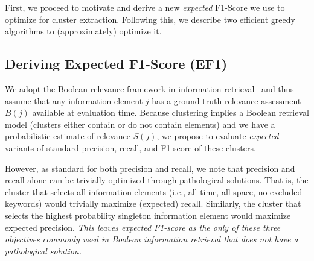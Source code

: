 First, we proceed to motivate and derive a new \emph{expected} F1-Score we use to optimize for cluster extraction.  %
Following this, we describe two efficient greedy algorithms to (approximately) optimize it.  %

\subsection{Deriving Expected F1-Score (EF1)}

We adopt the Boolean relevance framework in information retrieval~\cite{Baeza-Yates2010} and thus assume that any information element $j$ has a ground truth relevance assessment $B(j)$ available at evaluation time.  
Because clustering implies a Boolean retrieval model (clusters either contain or do not contain elements) and we have a probabilistic estimate of relevance $S(j)$, we propose to evaluate
\emph{expected} variants of standard precision, recall, and F1-score of these clusters.

However, as standard for both precision and recall, we note that precision and recall alone can be trivially optimized through pathological solutions.  That is, the cluster that selects all information elements (i.e., all time, all space, no excluded keywords) would trivially maximize (expected) recall.  Similarly, the cluster that selects the highest probability singleton information element would maximize expected precision.  \emph{This leaves expected F1-score as the only of these three objectives commonly used in Boolean information retrieval that does not have a pathological solution.}

